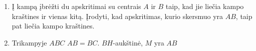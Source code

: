 \begin{enumerate}
  \item Į kampą įbrėžti du apskritimai su centrais $A$ ir $B$
    taip, kad jie liečia kampo kraštines ir vienas kitą.
    Įrodyti, kad apskritimas, kurio skersmuo yra $AB$, taip
    pat liečia kampo kraštines.
  \item Trikampyje $ABC$ $AB=BC$. $BH$-aukštinė, $M$ yra $AB$ 

\end{enumerate}
